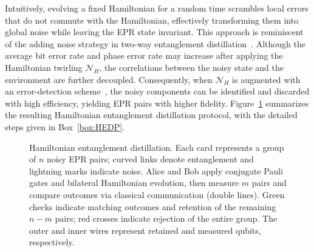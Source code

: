 \documentclass[onecolumn,prx,longbibliography,nofootinbib, superscriptaddress]{revtex4-2}
\theoremstyle{recap}
\begin{document}
Intuitively, evolving a fixed Hamiltonian for a random time scrambles local errors that do not commute with the Hamiltonian, effectively transforming them into global noise while leaving the EPR state invariant. This approach is reminiscent of the adding noise strategy in two-way entanglement distillation~\cite{Renner2005AddingNoise}. Although the average bit error rate and phase error rate may increase after applying the Hamiltonian twirling $\mathcal{N}_H$, the correlations between the noisy state and the environment are further decoupled. Consequently, when $\mathcal{N}_{H}$ is augmented with an error-detection scheme~\cite{gu2025}, the noisy components can be identified and discarded with high efficiency, yielding EPR pairs with higher fidelity. Figure~\ref{fig:hedp-overview} summarizes the resulting Hamiltonian entanglement distillation protocol, with the detailed steps given in Box~\ref{box:HEDP}.
\begin{figure}[htbp]
    \centering
    \resizebox{0.9\linewidth}{!}{}
    \caption{Hamiltonian entanglement distillation. Each card represents a group of $n$ noisy EPR pairs; curved links denote entanglement and lightning marks indicate noise. Alice and Bob apply conjugate Pauli gates and bilateral Hamiltonian evolution, then measure $m$ pairs and compare outcomes via classical communication (double lines). Green checks indicate matching outcomes and retention of the remaining $n-m$ pairs; red crosses indicate rejection of the entire group. The outer and inner wires represent retained and measured qubits, respectively.}
    \label{fig:hedp-overview}
\end{figure}
\end{document}
